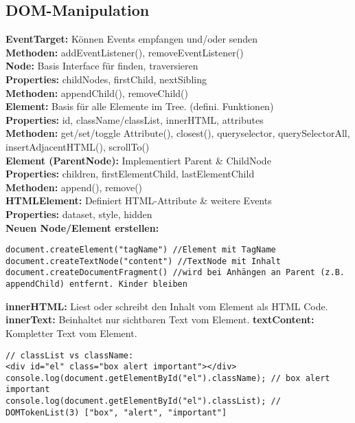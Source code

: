 \documentclass[7pt,landscape,a4paper]{scrartcl}
\begin{document}
\begin{multicols*}{4}
\subsection{DOM-Manipulation}
	\textcolor{b}{\textbf{EventTarget:}} Können Events empfangen und/oder senden\\
	\textbf{Methoden:} addEventListener(), removeEventListener()\\
	\textcolor{b}{\textbf{Node:}} Basis Interface für finden, traversieren\\
	\textbf{Properties:} childNodes, firstChild, nextSibling\\
	\textbf{Methoden:} appendChild(), removeChild()\\
	\textcolor{b}{\textbf{Element:}} Basis für alle Elemente im Tree. (defini. Funktionen)\\
	\textbf{Properties:} id, className/classList, innerHTML, attributes\\
	\textbf{Methoden:} get/set/toggle Attribute(), closest(), queryselector, querySelectorAll, insertAdjacentHTML(), scrollTo()\\
	\textcolor{b}{\textbf{Element (ParentNode):}} Implementiert Parent \& ChildNode\\
	\textbf{Properties:} children, firstElementChild, lastElementChild\\
	\textbf{Methoden:} append(), remove()\\
	\textcolor{b}{\textbf{HTMLElement:}} Definiert HTML-Attribute \& weitere Events\\
	\textbf{Properties:} dataset, style, hidden\\
	\textcolor{b}{\textbf{Neuen Node/Element erstellen:}}
\begin{lstlisting}[style=htmlcssjs]
document.createElement("tagName") //Element mit TagName
document.createTextNode("content") //TextNode mit Inhalt
document.createDocumentFragment() //wird bei Anhängen an Parent (z.B. appendChild) entfernt. Kinder bleiben
\end{lstlisting}
	\textbf{innerHTML:} Liest oder schreibt den Inhalt vom Element als HTML Code. \textbf{innerText:} Beinhaltet nur sichtbaren Text vom Element. \textbf{textContent:} Kompletter Text vom Element.
\begin{lstlisting}[style=htmlcssjs]
// classList vs className:
<div id="el" class="box alert important"></div>
console.log(document.getElementById("el").className); // box alert important
console.log(document.getElementById("el").classList); // DOMTokenList(3) ["box", "alert", "important"]
\end{lstlisting}

\end{multicols*}
\end{document}
